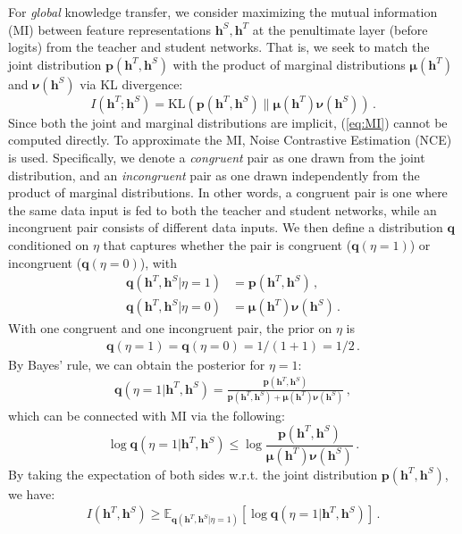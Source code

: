 \documentclass[final]{cvpr}
\newcommand{\hv}{{\boldsymbol h}}
\newcommand{\pv}{{\boldsymbol p}}
\newcommand{\qv}{{\boldsymbol q}}
\newcommand{\muv}{{\boldsymbol \mu}}
\newcommand{\nuv}{{\boldsymbol \nu}}
\theoremstyle{definition}
\newcommand{\Ep}{{\mathbb E}}
\begin{document}
For \emph{global} knowledge transfer, we consider maximizing the mutual information (MI) between feature representations $\hv^S, \hv^T$ at the penultimate layer (before logits) from the teacher and student networks. That is, we seek to match the joint distribution $\pv(\hv^T, \hv^S)$ with the product of marginal distributions $\muv(\hv^T)$ and $\nuv(\hv^S)$ via KL divergence:
\begin{equation}
\label{eq:MI}
I(\hv^T; \hv^S) = \mathrm{KL}(\pv(\hv^T, \hv^S) \| \muv(\hv^T)\nuv(\hv^S))\,.
\end{equation}
Since both the joint and marginal distributions are implicit, (\ref{eq:MI}) cannot be computed directly. To approximate the MI, Noise Contrastive Estimation (NCE)~\cite{gutmann2010noise} is used. Specifically,
we denote a \textit{congruent} pair as one drawn from the joint distribution, and an \textit{incongruent} pair as one drawn independently from the product of marginal distributions.
In other words, a congruent pair is one where the same data input is fed to both the teacher and student networks, while an incongruent pair consists of different data inputs. 
We then define a distribution $\qv$ conditioned on $\eta$ that captures whether the pair is congruent ($\qv(\eta=1)$) or incongruent ($\qv(\eta=0)$), with 
\begin{align}
    \qv(\hv^T, \hv^S|\eta=1) &= \pv(\hv^T, \hv^S)\,, \\ \qv(\hv^T, \hv^S|\eta=0) &=\muv(\hv^T)\nuv(\hv^S)\,.
\end{align}
With one congruent and one incongruent pair,
the prior on $\eta$ is 
\begin{align}
    \qv(\eta=1) = \qv(\eta=0) =1/(1+1)=1/2 \,. \end{align}
By Bayes' rule, we can obtain the posterior for $\eta=1$:
\begin{align}
\label{eq:bayes}
\qv(\eta=1 | \hv^T, \hv^S) =
\frac{\pv(\hv^T, \hv^S)}{\pv(\hv^T, \hv^S) + \muv(\hv^T)\nuv(\hv^S)}\,,
\end{align}
which can be connected with MI via the following:
\begin{equation}
\log \qv(\eta=1|\hv^T, \hv^S) \leq  \log \frac{\pv(\hv^T, \hv^S)}{\muv(\hv^T)\nuv(\hv^S)}\,.
\end{equation}
By taking the expectation of both sides w.r.t. the joint distribution $\pv(\hv^T,\hv^S)$, we have:
\begin{align}
\label{eq:MI_lowerbound}
I(\hv^T, \hv^S) \geq \Ep_{\qv(\hv^T, \hv^S|\eta=1)} [\log \qv(\eta=1 | \hv^T, \hv^S)]\,.
\end{align}
\end{document}
